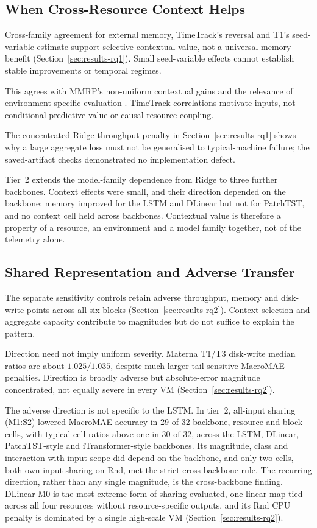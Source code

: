 \documentclass[a4paper,fleqn]{cas-dc}
\begin{document}
\subsection{When Cross-Resource Context Helps}
\label{sec:discussion-context}

Cross-family agreement for external memory, TimeTrack's reversal and T1's
seed-variable estimate support selective contextual value, not a universal
memory benefit (Section~\ref{sec:results-rq1}). Small seed-variable effects
cannot establish stable improvements or temporal regimes.

This agrees with MMRP's non-uniform contextual gains \citep{Tripathi2025MMRP}
and the relevance of environment-specific evaluation
\citep{Rossi2025CloudUncertainty}. TimeTrack correlations
\citep{Meliani2025TimeTrack} motivate inputs, not conditional predictive value
or causal resource coupling.

The concentrated Ridge throughput penalty in Section~\ref{sec:results-rq1}
shows why a large aggregate loss must not be generalised to typical-machine
failure; the saved-artifact checks demonstrated no implementation defect.

Tier~2 extends the model-family dependence from Ridge to three further
backbones. Context effects were small, and their direction depended on the
backbone: memory improved for the LSTM and DLinear but not for PatchTST, and
no context cell held across backbones. Contextual value is therefore a
property of a resource, an environment and a model family together, not of
the telemetry alone.

\subsection{Shared Representation and Adverse Transfer}
\label{sec:discussion-sharing}

The separate sensitivity controls retain adverse throughput, memory and
disk-write points across all six blocks (Section~\ref{sec:results-rq2}).
Context selection and aggregate capacity contribute to magnitudes but do not
suffice to explain the pattern.

Direction need not imply uniform severity. Materna T1/T3 disk-write median
ratios are about $1.025/1.035$, despite much larger tail-sensitive MacroMAE penalties.
Direction is broadly adverse but absolute-error magnitude concentrated,
not equally severe in every VM (Section~\ref{sec:results-rq2}).

The adverse direction is not specific to the LSTM. In tier~2, all-input
sharing (M1:S2) lowered MacroMAE accuracy in 29 of 32 backbone, resource and
block cells, with typical-cell ratios above one in 30 of 32, across the
LSTM, DLinear, PatchTST-style and iTransformer-style backbones. Its
magnitude, class and interaction with input scope did depend on the
backbone, and only two cells, both own-input sharing on Rnd, met the strict
cross-backbone rule. The recurring direction, rather than any single
magnitude, is the cross-backbone finding. DLinear M0 is the most extreme
form of sharing evaluated, one linear map tied across all four resources
without resource-specific outputs, and its Rnd CPU penalty is dominated by a
single high-scale VM (Section~\ref{sec:results-rq2}).
\end{document}
